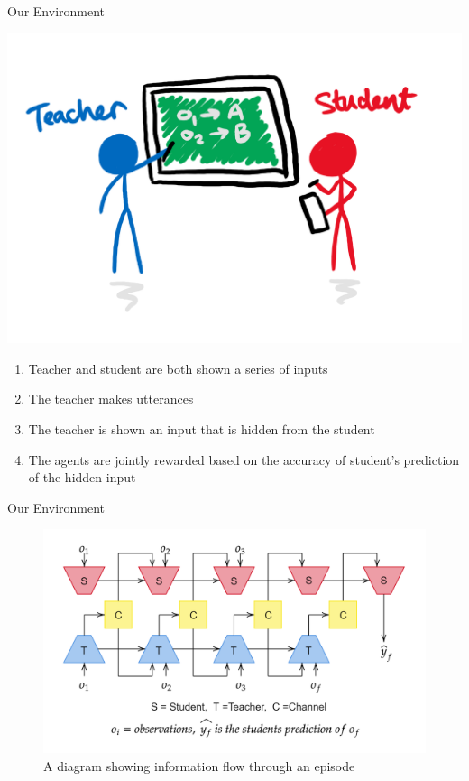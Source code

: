 \begin{frame}{Our Environment}
    
    \centering
    \includegraphics[width=0.6\linewidth]{figures/teacher_student_cartoon.png}
    \vspace{-0.3cm}
    
    \begin{enumerate}
        \item Teacher and student are both shown a series of inputs
        \item The teacher makes utterances
        \item The teacher is shown an input that is hidden from the student
        \item The agents are jointly rewarded based on the accuracy of student's prediction of the hidden input
    \end{enumerate}
    
\end{frame}

\begin{frame}{Our Environment}
    
    \begin{figure}
        \centering
        \includegraphics[width=1\linewidth]{figures/arch_diagram_red_blue.png}
        \caption{A diagram showing information flow through an episode}
        \label{fig:arch_diagram}
    \end{figure}
    
\end{frame}

